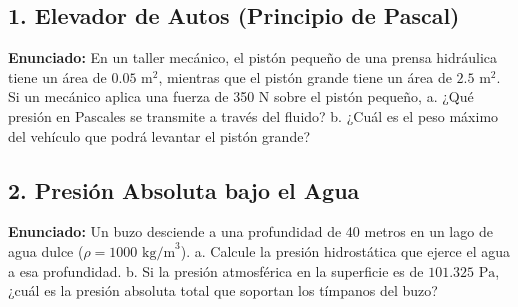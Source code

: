 \documentclass[12pt, letterpaper]{article}
\begin{document}
	\vspace{0.5cm}
	
	\subsection*{1. Elevador de Autos (Principio de Pascal)}
	\noindent \textbf{Enunciado:} En un taller mecánico, el pistón pequeño de una prensa hidráulica tiene un área de $0.05 \text{ m}^2$, mientras que el pistón grande tiene un área de $2.5 \text{ m}^2$. Si un mecánico aplica una fuerza de 350 N sobre el pistón pequeño, a. ¿Qué presión en Pascales se transmite a través del fluido? b. ¿Cuál es el peso máximo del vehículo que podrá levantar el pistón grande?
	
	
	\subsection*{2. Presión Absoluta bajo el Agua}
	\noindent \textbf{Enunciado:} Un buzo desciende a una profundidad de 40 metros en un lago de agua dulce ($\rho = 1000 \text{ kg/m}^3$). a. Calcule la presión hidrostática que ejerce el agua a esa profundidad. b. Si la presión atmosférica en la superficie es de $101.325 \text{ Pa}$, ¿cuál es la presión absoluta total que soportan los tímpanos del buzo?
	
	
\end{document}
